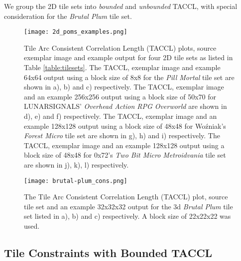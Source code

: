 We group the 2D tile sets into \textit{bounded} and \textit{unbounded} TACCL, with special consideration for
the \textit{Brutal Plum} tile set.


\begin{figure*}[ht]
  \texttt{[image: 2d\_poms\_examples.png]}
  \caption{Tile Arc Consistent Correlation Length (TACCL) plots, source exemplar image and example output for four 2D tile sets as listed in Table \ref{table:tilesets}.
           The TACCL, exemplar image and example 64x64 output using a block size of 8x8 for the \textit{Pill Mortal} tile set are shown in a), b) and c) respectively. The TACCL, exemplar image and an example 256x256 output using a block size of 50x70 for LUNARSIGNALS' \textit{Overhead Action RPG Overworld} are shown in d), e) and f) respectively. The TACCL, exemplar image and an example 128x128 output using a block size of 48x48 for Wo\'zniak's \textit{Forest Micro} tile set are shown in g), h) and i) respectively. The TACCL, exemplar image and an example 128x128 output using a block size of 48x48 for 0x72's \textit{Two Bit Micro Metroidvania} tile set are shown in j), k), l) respectively. }
  \label{fig:2dexamples}
\end{figure*}

\begin{figure}[h]
  \centering
  \texttt{[image: brutal-plum\_cons.png]}
  \caption{The Tile Arc Consistent Correlation Length (TACCL) plot, source tile set and an example 32x32x32 output for the 3d \textit{Brutal Plum} tile set listed in a), b) and c) respectively. A block size of 22x22x22 was used.}
  \label{fig:brutal_plum}
\end{figure}





\subsection{Tile Constraints with Bounded TACCL}

